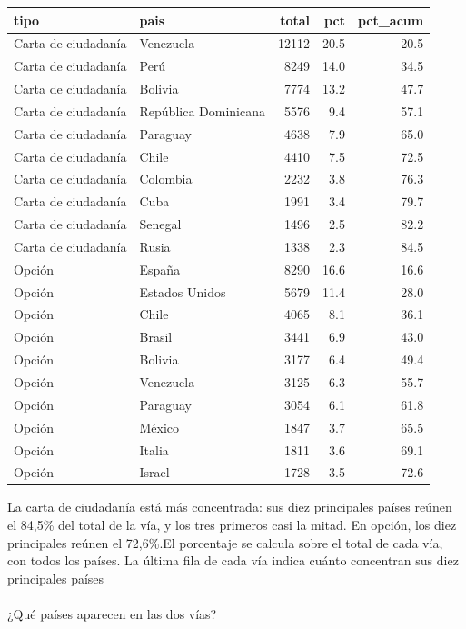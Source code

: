 \documentclass[
  letterpaper,
  DIV=11,
  numbers=noendperiod]{scrartcl}
\makeatletter
\let\oldparagraph\paragraph
\renewcommand{\paragraph}{
    \@ifstar
      \xxxParagraphStar
      \xxxParagraphNoStar
  }
\newcommand{\xxxParagraphStar}[1]{\oldparagraph*{#1}\mbox{}}
\newcommand{\xxxParagraphNoStar}[1]{\oldparagraph{#1}\mbox{}}
\makeatother
\begin{document}
\begin{longtable}[]{@{}llrrr@{}}
\toprule\noalign{}
tipo & pais & total & pct & pct\_acum \\
\midrule\noalign{}
\endhead
\bottomrule\noalign{}
\endlastfoot
Carta de ciudadanía & Venezuela & 12112 & 20.5 & 20.5 \\
Carta de ciudadanía & Perú & 8249 & 14.0 & 34.5 \\
Carta de ciudadanía & Bolivia & 7774 & 13.2 & 47.7 \\
Carta de ciudadanía & República Dominicana & 5576 & 9.4 & 57.1 \\
Carta de ciudadanía & Paraguay & 4638 & 7.9 & 65.0 \\
Carta de ciudadanía & Chile & 4410 & 7.5 & 72.5 \\
Carta de ciudadanía & Colombia & 2232 & 3.8 & 76.3 \\
Carta de ciudadanía & Cuba & 1991 & 3.4 & 79.7 \\
Carta de ciudadanía & Senegal & 1496 & 2.5 & 82.2 \\
Carta de ciudadanía & Rusia & 1338 & 2.3 & 84.5 \\
Opción & España & 8290 & 16.6 & 16.6 \\
Opción & Estados Unidos & 5679 & 11.4 & 28.0 \\
Opción & Chile & 4065 & 8.1 & 36.1 \\
Opción & Brasil & 3441 & 6.9 & 43.0 \\
Opción & Bolivia & 3177 & 6.4 & 49.4 \\
Opción & Venezuela & 3125 & 6.3 & 55.7 \\
Opción & Paraguay & 3054 & 6.1 & 61.8 \\
Opción & México & 1847 & 3.7 & 65.5 \\
Opción & Italia & 1811 & 3.6 & 69.1 \\
Opción & Israel & 1728 & 3.5 & 72.6 \\
\end{longtable}

La carta de ciudadanía está más concentrada: sus diez principales países
reúnen el 84,5\% del total de la vía, y los tres primeros casi la mitad.
En opción, los diez principales reúnen el 72,6\%.El porcentaje se
calcula sobre el total de cada vía, con todos los países. La última fila
de cada vía indica cuánto concentran sus diez principales países

\paragraph{¿Qué países aparecen en las dos
vías?}\label{quuxe9-pauxedses-aparecen-en-las-dos-vuxedas}
\end{document}
